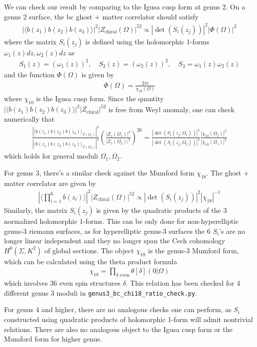 \documentclass[12pt,letterpaper]{article}
\def\ie{\begin{equation}\begin{aligned}}
\def\fe{\end{aligned}\end{equation}}
\numberwithin{equation}{section}
\begin{document}
We can check our result by comparing to the Igusa cusp form at genus 2. On a genus 2 surface, the bc ghost + matter correlator should satisfy
\ie
\left|\langle b(z_1)b(z_2)b(z_3) \rangle\right|^2 |Z_\text{chiral}(\Omega)|^{52} \propto |\det(S_i(z_j))|^2|\Phi(\Omega)|^2
\fe
where the matrix $S_i(z_j)$ is defined using the holomorphic 1-forms $\omega_1(z)dz, \omega_2(z)dz$ as
\ie
S_1(z)=\left(\omega_1(z)\right)^2,\quad S_2(z)=\left(\omega_2(z)\right)^2,\quad S_3=\omega_1(z) \omega_2(z)
\fe
and the function $\Phi(\Omega)$ is given by
\ie
\Phi(\Omega) = \frac{2\pi i}{\chi_{10}(\Omega)}
\fe
where $\chi_{10}$ is the Igusa cusp form. Since the quantity $\left|\langle b(z_1)b(z_2)b(z_3) \rangle\right|^2 |Z_\text{chiral}|^{52}$ is free from Weyl anomaly, one can check numerically that
\ie
\frac{\left|\langle b(z_1)b(z_2)b(z_3) \rangle_{\Sigma(\Omega_1)}\right|^2 }{\left|\langle b(z_1)b(z_2)b(z_3) \rangle_{\Sigma(\Omega_2)}\right|^2} \left(\frac{|Z_1(\Omega_1)|^{2}}{|Z_1(\Omega_2)|^{2}}\right)^{26} = \frac{|\det (S_i(z_j;\Omega_1))|^2}{|\det (S_i(z_j;\Omega_2))|^2} \frac{|\chi_{10}(\Omega_2)|^2}{|\chi_{10}(\Omega_1)|^2}
\fe
which holds for general moduli $\Omega_1, \Omega_2$.

For genus 3, there's a similar check against the Mumford form $\chi_{18}$. The ghost + matter correlator are given by
\ie
\left|\langle \prod_{i=1}^6 b(z_i)\rangle\right|^2 |Z_\text{chiral}(\Omega)|^{52} \propto |\det(S_i(z_j))|^2|\chi_{18}|^{-1}
\fe
Similarly, the matrix $S_i(z_j)$ is given by the quadratic products of the 3 normalized holomorphic 1-forms. This can be only done for non-hyperelliptic genus-3 riemann surfaces, as for hyperelliptic genus-3 surfaces the 6 $S_i$'s are no longer linear independent and they no longer span the Cech cohomology $H^0(\Sigma, K^2)$ of global sections. The object $\chi_{18}$ is the genus-3 Mumford form, which can be calculated using the theta product formula
\ie
\chi_{18}=\prod_{\delta \text{ even}}\theta[\delta](0|\Omega)
\fe
which involves 36 even spin structures $\delta$. This relation has been checked for 4 different genus 3 moduli in \texttt{genus3\_bc\_chi18\_ratio\_check.py}.

For genus 4 and higher, there are no analogous checks one can perform, as $S_i$ constructed using quadratic products of holomorphic 1-form will admit nontrivial relations. There are also no analogous object to the Igusa cusp form or the Mumford form for higher genus.
\end{document}
